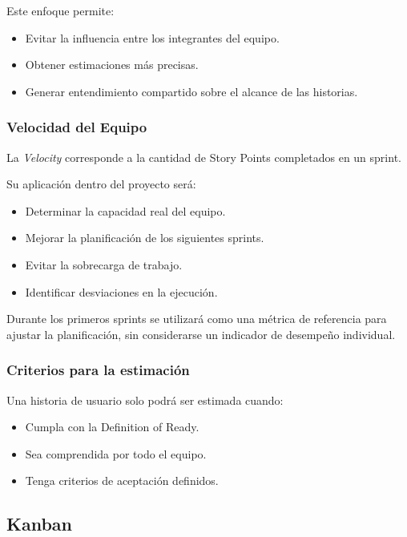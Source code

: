 \documentclass[12pt]{article}
\begin{document}
Este enfoque permite:

\begin{itemize}
    \item Evitar la influencia entre los integrantes del equipo.
    \item Obtener estimaciones más precisas.
    \item Generar entendimiento compartido sobre el alcance de las historias.
\end{itemize}

\subsubsection{Velocidad del Equipo}

La \textit{Velocity} corresponde a la cantidad de Story Points completados en un sprint.

Su aplicación dentro del proyecto será:

\begin{itemize}
    \item Determinar la capacidad real del equipo.
    \item Mejorar la planificación de los siguientes sprints.
    \item Evitar la sobrecarga de trabajo.
    \item Identificar desviaciones en la ejecución.
\end{itemize}

Durante los primeros sprints se utilizará como una métrica de referencia para ajustar la planificación, sin considerarse un indicador de desempeño individual.

\subsubsection{Criterios para la estimación}

Una historia de usuario solo podrá ser estimada cuando:

\begin{itemize}
    \item Cumpla con la Definition of Ready.
    \item Sea comprendida por todo el equipo.
    \item Tenga criterios de aceptación definidos.
\end{itemize}

\subsection{Kanban}
\end{document}
